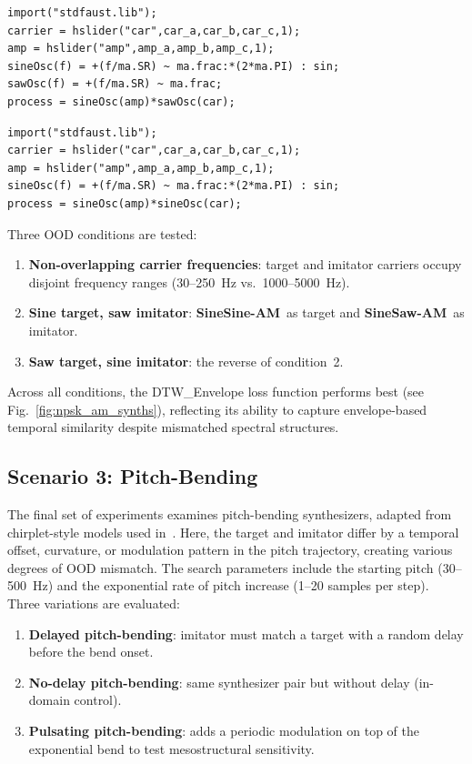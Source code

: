 \documentclass[runningheads]{llncs}
\newcommand{\FMMod}{\textbf{SineSaw-AM}\xspace}
\newcommand{\FMModvtwo}{\textbf{SineSine-AM}\xspace}
\begin{document}
\begin{lstlisting}[caption={\FMMod}, label={lst:program3},language=Faust,float,floatplacement=!H,xleftmargin=1em,xrightmargin=0.5em,firstnumber=0,aboveskip=0em, belowskip=-1em]
import("stdfaust.lib");
carrier = hslider("car",car_a,car_b,car_c,1);
amp = hslider("amp",amp_a,amp_b,amp_c,1);
sineOsc(f) = +(f/ma.SR) ~ ma.frac:*(2*ma.PI) : sin;
sawOsc(f) = +(f/ma.SR) ~ ma.frac;
process = sineOsc(amp)*sawOsc(car);
\end{lstlisting}

\begin{lstlisting}[caption={\FMModvtwo}, label={lst:program3_v2},language=Faust,float,floatplacement=!H,xleftmargin=1em,xrightmargin=0.5em,firstnumber=0,aboveskip=0em, belowskip=-1em]
import("stdfaust.lib");
carrier = hslider("car",car_a,car_b,car_c,1);
amp = hslider("amp",amp_a,amp_b,amp_c,1);
sineOsc(f) = +(f/ma.SR) ~ ma.frac:*(2*ma.PI) : sin;
process = sineOsc(amp)*sineOsc(car);
\end{lstlisting}

Three OOD conditions are tested:
\begin{enumerate}
  \item \textbf{Non-overlapping carrier frequencies}: target and imitator carriers occupy disjoint frequency ranges (30–250~Hz vs.~1000–5000~Hz).  
  \item \textbf{Sine target, saw imitator}: \FMModvtwo\ as target and \FMMod\ as imitator.  
  \item \textbf{Saw target, sine imitator}: the reverse of condition~2.  
\end{enumerate}

Across all conditions, the DTW\_Envelope loss function performs best (see Fig.~\ref{fig:npsk_am_synths}), reflecting its ability to capture envelope-based temporal similarity despite mismatched spectral structures.



\subsection{Scenario 3: Pitch-Bending}
The final set of experiments examines pitch-bending synthesizers, adapted from chirplet-style models used in~\cite{vahidi2023mesostructures}.  
Here, the target and imitator differ by a temporal offset, curvature, or modulation pattern in the pitch trajectory, creating various degrees of OOD mismatch.  
The search parameters include the starting pitch (30–500~Hz) and the exponential rate of pitch increase (1–20 samples per step).  
Three variations are evaluated:
\begin{enumerate}
  \item \textbf{Delayed pitch-bending}: imitator must match a target with a random delay before the bend onset.  
  \item \textbf{No-delay pitch-bending}: same synthesizer pair but without delay (in-domain control).  
  \item \textbf{Pulsating pitch-bending}: adds a periodic modulation on top of the exponential bend to test mesostructural sensitivity.
\end{enumerate}
\end{document}
